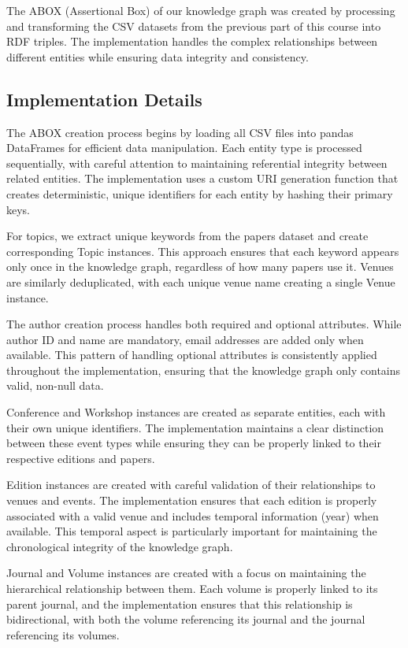 \documentclass[10pt,a4paper]{article}
\begin{document}
The ABOX (Assertional Box) of our knowledge graph was created by processing and transforming the CSV datasets from the previous part of this course into RDF triples. The implementation handles the complex relationships between different entities while ensuring data integrity and consistency.

\subsection{Implementation Details}

The ABOX creation process begins by loading all CSV files into pandas DataFrames for efficient data manipulation. Each entity type is processed sequentially, with careful attention to maintaining referential integrity between related entities. The implementation uses a custom URI generation function that creates deterministic, unique identifiers for each entity by hashing their primary keys.

For topics, we extract unique keywords from the papers dataset and create corresponding Topic instances. This approach ensures that each keyword appears only once in the knowledge graph, regardless of how many papers use it. Venues are similarly deduplicated, with each unique venue name creating a single Venue instance.

The author creation process handles both required and optional attributes. While author ID and name are mandatory, email addresses are added only when available. This pattern of handling optional attributes is consistently applied throughout the implementation, ensuring that the knowledge graph only contains valid, non-null data.

Conference and Workshop instances are created as separate entities, each with their own unique identifiers. The implementation maintains a clear distinction between these event types while ensuring they can be properly linked to their respective editions and papers.

Edition instances are created with careful validation of their relationships to venues and events. The implementation ensures that each edition is properly associated with a valid venue and includes temporal information (year) when available. This temporal aspect is particularly important for maintaining the chronological integrity of the knowledge graph.

Journal and Volume instances are created with a focus on maintaining the hierarchical relationship between them. Each volume is properly linked to its parent journal, and the implementation ensures that this relationship is bidirectional, with both the volume referencing its journal and the journal referencing its volumes.
\end{document}
